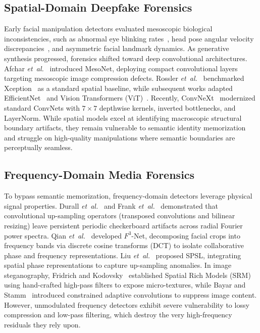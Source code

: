 \documentclass[10pt,twocolumn,letterpaper]{article}
\newcommand{\etal}{\textit{et~al.}}
\begin{document}
\subsection{Spatial-Domain Deepfake Forensics}
Early facial manipulation detectors evaluated mesoscopic biological inconsistencies, such as abnormal eye blinking rates~\cite{li2018ictu}, head pose angular velocity discrepancies~\cite{yang2019exposing}, and asymmetric facial landmark dynamics. As generative synthesis progressed, forensics shifted toward deep convolutional architectures. Afchar \etal~\cite{afchar2018mesonet} introduced MesoNet, deploying compact convolutional layers targeting mesoscopic image compression defects. Rossler \etal~\cite{roessler2019faceforensicspp} benchmarked Xception~\cite{chollet2017xception} as a standard spatial baseline, while subsequent works adapted EfficientNet~\cite{tan2019efficientnet} and Vision Transformers (ViT)~\cite{dosovitskiy2020image,wodajo2021deepfake}. Recently, ConvNeXt~\cite{liu2022convnet} modernized standard ConvNets with $7\times 7$ depthwise kernels, inverted bottlenecks, and LayerNorm. While spatial models excel at identifying macroscopic structural boundary artifacts, they remain vulnerable to semantic identity memorization and struggle on high-quality manipulations where semantic boundaries are perceptually seamless.

\subsection{Frequency-Domain Media Forensics}
To bypass semantic memorization, frequency-domain detectors leverage physical signal properties. Durall \etal~\cite{durall2020watch} and Frank \etal~\cite{frank2020leveraging} demonstrated that convolutional up-sampling operators (transposed convolutions and bilinear resizing) leave persistent periodic checkerboard artifacts across radial Fourier power spectra. Qian \etal~\cite{qian2020thinking} developed $F^3$-Net, decomposing facial crops into frequency bands via discrete cosine transforms (DCT) to isolate collaborative phase and frequency representations. Liu \etal~\cite{liu2021spatial} proposed SPSL, integrating spatial phase representations to capture up-sampling anomalies. In image steganography, Fridrich and Kodovsky~\cite{fridrich2012rich} established Spatial Rich Models (SRM) using hand-crafted high-pass filters to expose micro-textures, while Bayar and Stamm~\cite{bayar2018constrained} introduced constrained adaptive convolutions to suppress image content. However, unmodulated frequency detectors exhibit severe vulnerability to lossy compression and low-pass filtering, which destroy the very high-frequency residuals they rely upon.
\end{document}
